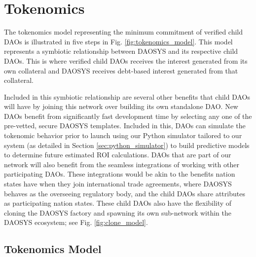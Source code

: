 \documentclass[journal,twocolumn,12pt]{ieeesyscoin}
\begin{document}
\section{Tokenomics}
\label{sec:tokenomics}

The tokenomics model representing the minimum commitment of verified child DAOs is illustrated in five steps in Fig. \ref{fig:tokenomics_model}. This model represents a symbiotic relationship between DAOSYS and its respective child DAOs. This is where verified child DAOs receives the interest generated from its own collateral and DAOSYS receives debt-based interest generated from that collateral.

Included in this symbiotic relationship are several other benefits that child DAOs will have by joining this network over building its own standalone DAO. New DAOs benefit from significantly fast development time by selecting any one of the pre-vetted, secure DAOSYS templates. Included in this, DAOs can simulate the tokenomic behavior prior to launch using our Python simulator tailored to our system (as detailed in Section \ref{sec:python_simulator}) to build predictive models to determine future estimated ROI calculations. DAOs that are part of our network will also benefit from the seamless integrations of working with other participating DAOs. These integrations would be akin to the benefits nation states have when they join international trade agreements, where DAOSYS behaves as the overseeing regulatory body, and the child DAOs share attributes as participating nation states. These child DAOs also have the flexibility of cloning the DAOSYS factory and spawning its own sub-network within the DAOSYS ecosystem; see Fig. \ref{fig:clone_model}.  

\subsection{Tokenomics Model}
\label{sec:tokenomics_model}
\end{document}
